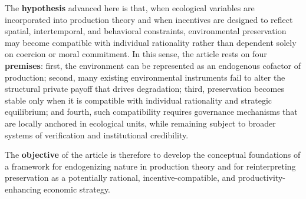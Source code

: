 

The \textbf{hypothesis} advanced here is that, when ecological variables are incorporated into production theory and when incentives are designed to reflect spatial, intertemporal, and behavioral constraints, environmental preservation may become compatible with individual rationality rather than dependent solely on coercion or moral commitment. In this sense, the article rests on four \textbf{premises}: first, the environment can be represented as an endogenous cofactor of production; second, many existing environmental instruments fail to alter the structural private payoff that drives degradation; third, preservation becomes stable only when it is compatible with individual rationality and strategic equilibrium; and fourth, such compatibility requires governance mechanisms that are locally anchored in ecological units, while remaining subject to broader systems of verification and institutional credibility.

The \textbf{objective} of the article is therefore to develop the conceptual foundations of a framework for endogenizing nature in production theory and for reinterpreting preservation as a potentially rational, incentive-compatible, and productivity-enhancing economic strategy. 


